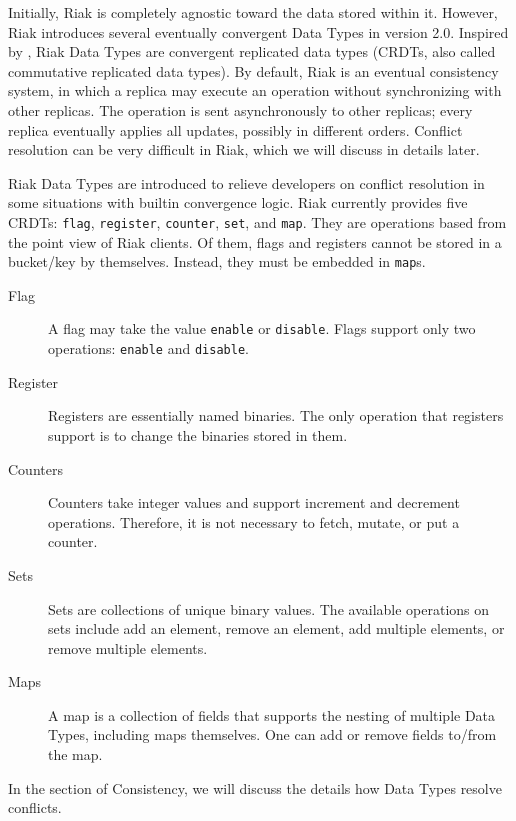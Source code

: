 \documentclass[11pt]{book}
\begin{document}
Initially, Riak is completely agnostic toward the data stored within it. However, Riak introduces several eventually convergent Data Types in version 2.0. Inspired by \cite{CRDT2011}, Riak Data Types are convergent replicated data types (CRDTs, also called commutative replicated data types). By default, Riak is an eventual consistency system, in which a replica may execute an operation without synchronizing with other replicas. The operation is sent asynchronously to other replicas; every replica eventually applies all updates, possibly in different orders. Conflict resolution can be very difficult in Riak, which we will discuss in details later.

Riak Data Types are introduced to relieve developers on conflict resolution in some situations with builtin convergence logic. Riak currently provides five CRDTs: \texttt{flag}, \texttt{register}, \texttt{counter}, \texttt{set}, and \texttt{map}. They are operations based from the point view of Riak clients. Of them, flags and registers cannot be stored in a bucket/key by themselves. Instead, they must be embedded in \texttt{map}s.

\begin{description}
\item[Flag]
A flag may take the value \texttt{enable} or \texttt{disable}.
Flags support only two operations: \texttt{enable} and \texttt{disable}.

\item[Register]
Registers are essentially named binaries.
The only operation that registers support is to change the binaries stored in them.

\item[Counters]
Counters take integer values and support increment and decrement operations. Therefore, it is not necessary to fetch, mutate, or put a counter.

\item[Sets]
Sets are collections of unique binary values.
The available operations on sets include add an element, remove an element, add multiple elements, or remove multiple elements.

\item[Maps]
A map is a collection of fields that supports the nesting of multiple Data Types, including maps themselves. One can add or remove fields to/from the map.
\end{description}

In the section of Consistency, we will discuss the details how Data Types resolve conflicts.
\end{document}
